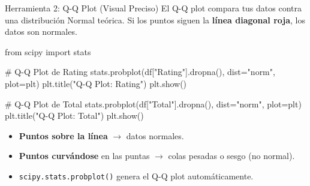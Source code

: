 \documentclass[aspectratio=169, 11pt]{beamer}
\begin{document}
\begin{frame}[fragile,shrink=28]{Herramienta 2: Q-Q Plot (Visual Preciso)}
  \vspace{-6pt}
  {\footnotesize
    El Q-Q plot compara tus datos contra una distribución Normal teórica.
    Si los puntos siguen la \textbf{línea diagonal roja}, los datos son normales.}

  \vspace{4pt}
  \begin{pyblock}
from scipy import stats

# Q-Q Plot de Rating
stats.probplot(df["Rating"].dropna(), dist="norm",
               plot=plt)
plt.title("Q-Q Plot: Rating")
plt.show()

# Q-Q Plot de Total
stats.probplot(df["Total"].dropna(), dist="norm",
               plot=plt)
plt.title("Q-Q Plot: Total")
plt.show()
  \end{pyblock}

  \vspace{4pt}
  {\scriptsize\color{textMuted}
  \begin{itemize}\setlength{\itemsep}{3pt}
    \item[{\color{codeGreen}\scriptsize\faCheckCircle}]
      \textbf{Puntos sobre la línea} $\to$ datos normales.
    \item[{\color{codeOrange}\scriptsize\faExclamationTriangle}]
      \textbf{Puntos curvándose} en las puntas $\to$ colas pesadas o sesgo (no normal).
    \item[{\color{arcaRed}\scriptsize\faArrowRight}]
      \texttt{scipy.stats.probplot()} genera el Q-Q plot automáticamente.
  \end{itemize}
  }
\end{frame}
\end{document}
